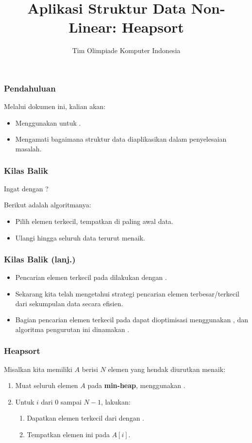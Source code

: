 

\title{Aplikasi Struktur Data Non-Linear: \newline Heapsort}
\author{Tim Olimpiade Komputer Indonesia}
\date{}



\begin{frame}
\titlepage
\end{frame}

\begin{frame}
\frametitle{Pendahuluan}
Melalui dokumen ini, kalian akan:
\begin{itemize}
  \item Menggunakan \pheap untuk \pheapsort.
  \item Mengamati bagaimana struktur data diaplikasikan dalam penyelesaian masalah.
\end{itemize}
\end{frame}

\begin{frame}
\frametitle{Kilas Balik}
Ingat dengan ?\newline

Berikut adalah algoritmanya:
\begin{itemize}
  \item Pilih elemen terkecil, tempatkan di paling awal data.
  \item Ulangi hingga seluruh data terurut menaik.
\end{itemize}
\end{frame}

\begin{frame}
\frametitle{Kilas Balik (lanj.)}
\begin{itemize}
  \item Pencarian elemen terkecil pada  dilakukan dengan .
  \item Sekarang kita telah mengetahui strategi pencarian elemen terbesar/terkecil dari sekumpulan data secara efisien.
  \item Bagian pencarian elemen terkecil pada  dapat dioptimisasi menggunakan \pheap, dan algoritma pengurutan ini dinamakan \newTerm{\pheapsort}.
\end{itemize}
\end{frame}

\begin{frame}
\frametitle{Heapsort}
Misalkan kita memiliki \farray $A$ berisi $N$ elemen yang hendak diurutkan menaik:
\begin{enumerate}
  \item Muat seluruh elemen \farray $A$ pada \textbf{min-heap}, menggunakan .
  \item Untuk $i$ dari $0$ sampai $N-1$, lakukan:
  \begin{enumerate}
    \item Dapatkan elemen terkecil dari \pheap dengan .
    \item Tempatkan elemen ini pada $A[i]$.
  \end{enumerate}
\end{enumerate}
\end{frame}

